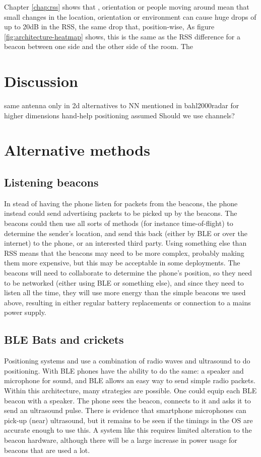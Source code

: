 Chapter \ref{chap:rss} shows that \mpi, orientation or people moving around mean that small changes in the location, orientation or environment can cause huge drops of up to 20dB in the RSS, the same drop that, position-wise, 
As figure \ref{fig:architecture-heatmap} shows, this is the same as the RSS difference for a beacon between one side and the other side of the room.
The 



\section{Discussion}
\label{sec:architecture-discussion}
same antenna
only in 2d
alternatives to NN mentioned in bahl2000radar for higher dimensions
hand-help positioning assumed
Should we use channels?

\section{Alternative methods}
\label{sec:architecture-alternative}
\subsection{Listening beacons}
In stead of having the phone listen for packets from the beacons, the phone instead could send advertising packets to be picked up by the beacons.
The beacons could then use all sorts of methods (for instance time-of-flight) to determine the sender's location, and send this back (either by BLE or over the internet) to the phone, or an interested third party.
Using something else than RSS means that the beacons may need to be more complex, probably making them more expensive, but this may be acceptable in some deployments.
The beacons will need to collaborate to determine the phone's position, so they need to be networked (either using BLE or something else), and since they need to listen all the time, they will use more energy than the simple beacons we used above, resulting in either regular battery replacements or connection to a mains power supply.

\subsection{BLE Bats and crickets}
Positioning systems \citep{harter2002anatomy} and \citep{priyantha2000cricket} use a combination of radio waves and ultrasound to do positioning.
With BLE phones have the ability to do the same: a speaker and microphone for sound, and BLE allows \apps an easy way to send simple radio packets.
Within this architecture, many strategies are possible.
One could equip each BLE beacon with a speaker.
The phone sees the beacon, connects to it and asks it to send an ultrasound pulse.
There is evidence that smartphone microphones can pick-up (near) ultrasound\citep{arentz2011near,bihler2011smartguide}, but it remains to be seen if the timings in the OS are accurate enough to use this.
A system like this requires limited alteration to the beacon hardware, although there will be a large increase in power usage for beacons that are used a lot.
